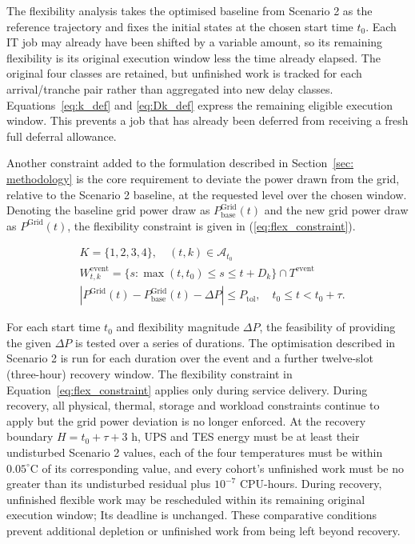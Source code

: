 \documentclass[lettersize,journal]{IEEEtran}
\begin{document}
The flexibility analysis takes the optimised baseline from Scenario 2 as the reference trajectory and fixes the initial states at the chosen start time $t_0$. Each IT job may already have been shifted by a variable amount, so its remaining flexibility is its original execution window less the time already elapsed. The original four classes are retained, but unfinished work is tracked for each arrival/tranche pair rather than aggregated into new delay classes. Equations~\eqref{eq:k_def} and \eqref{eq:Dk_def} express the remaining eligible execution window. This prevents a job that has already been deferred from receiving a fresh full deferral allowance.

Another constraint added to the formulation described in Section~\ref{sec: methodology} is the core requirement to deviate the power drawn from the grid, relative to the Scenario 2 baseline, at the requested level over the chosen window. Denoting the baseline grid power draw as $P^{\mathrm{Grid}}_{\mathrm{base}}(t)$ and the new grid power draw as $P^{\mathrm{Grid}}(t)$, the flexibility constraint is given in (\ref{eq:flex_constraint}).

\begin{align}
& K=\{1,2,3,4\},\quad (t,k)\in\mathcal A_{t_0} \label{eq:k_def} \\
& W^{\mathrm{event}}_{t,k}=\{s:\max(t,t_0)\leq s\leq t+D_k\}\cap T^{\mathrm{event}} \label{eq:Dk_def} \\
& \left|P^{\mathrm{Grid}}(t)-P^{\mathrm{Grid}}_{\mathrm{base}}(t)-\Delta P\right|\leq P_{\mathrm{tol}},\quad t_0\leq t<t_0+\tau. \label{eq:flex_constraint}
\end{align}

For each start time $t_0$ and flexibility magnitude $\Delta P$, the feasibility of providing the given $\Delta P$ is tested over a series of durations. The optimisation described in Scenario 2 is run for each duration over the event and a further twelve-slot (three-hour) recovery window. The flexibility constraint in Equation~\eqref{eq:flex_constraint} applies only during service delivery. During recovery, all physical, thermal, storage and workload constraints continue to apply but the grid power deviation is no longer enforced. At the recovery boundary $H=t_0+\tau+3$ h, UPS and TES energy must be at least their undisturbed Scenario 2 values, each of the four temperatures must be within $0.05^\circ$C of its corresponding value, and every cohort's unfinished work must be no greater than its undisturbed residual plus $10^{-7}$ CPU-hours. During recovery, unfinished flexible work may be rescheduled within its remaining original execution window; Its deadline is unchanged. These comparative conditions prevent additional depletion or unfinished work from being left beyond recovery.
\end{document}
